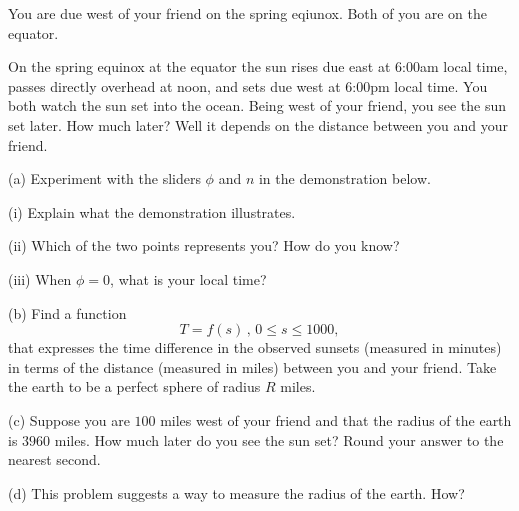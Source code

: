 \documentclass{ximera}
\begin{document}
\begin{question} \label{Q793:Angles}
You are due west of your friend on the spring eqiunox. Both of you are on the equator. 

On the spring equinox at the equator the sun rises due east at 6:00am local time, passes directly overhead at noon, and sets due west at 6:00pm local time. You both watch the sun set into the ocean. Being west of your friend, you see the sun set later. How much later? Well it depends on the distance between you and your friend.

(a) Experiment with the sliders $\phi$ and $n$ in the demonstration below.

(i) Explain what the demonstration illustrates.

(ii) Which of the two points represents you? How do you know?

(iii) When $\phi=0$, what is your local time? 

 
\begin{onlineOnly}
    \begin{center}
\end{center}
\end{onlineOnly}



(b) Find a function 
\[
   T = f(s) \, , \, 0\leq s \leq 1000 ,
\]
that expresses the time difference in the observed sunsets (measured in minutes) in terms of the distance (measured in miles) between you and your friend. Take the earth to be a perfect sphere of radius $R$ miles.

(c) Suppose you are $100$ miles west of your friend and that the radius of the earth is $3960$ miles. How much later do you see the sun set? Round your answer to the nearest second.

(d) This problem suggests a way to measure the radius of the earth. How?

\end{question}
\end{document}

